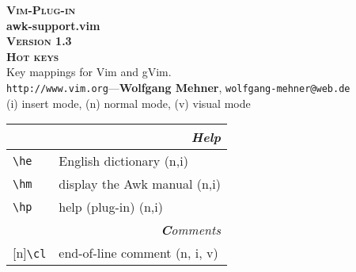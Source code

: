 \documentclass[oneside,10pt,landscape,DIV16]{scrartcl}
\newcommand{\Pluginversion}{1.3}
\newcommand{\Rep}{{\scriptsize{[n]}}}
\begin{document}
%

\begin{multicols}{3}
%
\begin{center}
%
\textbf{\textsc{\small{Vim-Plug-in}}}\\
\textbf{\LARGE{awk-support.vim}}\\
\textbf{\textsc{\small{Version \Pluginversion}}}\\
\vspace{1mm}%
\textbf{\textsc{\Huge{Hot keys}}}\\ 
\vspace{1mm}%
Key mappings for Vim and gVim.\\
{\tiny  \texttt{http://www.vim.org}\hspace{1.5mm}---\hspace{1.5mm}\textbf{Wolfgang Mehner},  \texttt{wolfgang-mehner@web.de}}\\
\vspace{1.0mm}
{\normalsize (i)} insert mode, {\normalsize (n)} normal mode, {\normalsize (v)} visual mode\\
\vspace{1.0mm}
%
\begin{tabular}[]{|p{11mm}|p{60mm}|}
\hline 
\multicolumn{2}{|r|}{\textsl{\textbf{H}elp}}\\[1.0ex]
\hline \verb'\he'   & English dictionary                     \hfill (n,i)\\
\hline \verb'\hm'   & display the Awk manual                 \hfill (n,i)\\
\hline \verb'\hp'   & help (plug-in)                         \hfill (n,i)\\
\hline 
\hline
\multicolumn{2}{|r|}{\textsl{\textbf{C}omments}}                       \\[1.0ex]
\hline \Rep\verb'\cl'   & end-of-line comment               \hfill (n, i, v)\\

\end{tabular}
\end{center}
\end{multicols}
\end{document}
